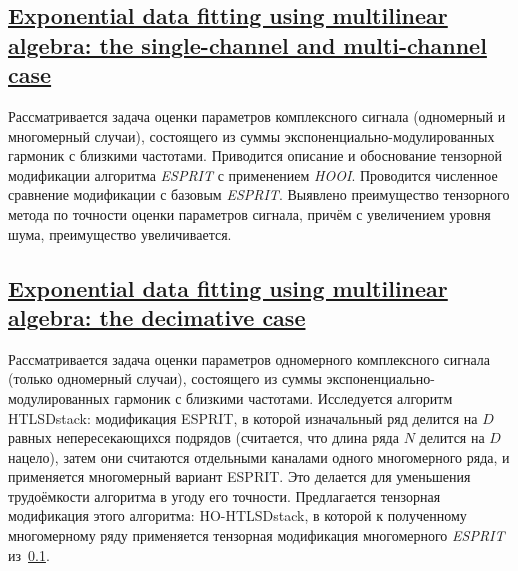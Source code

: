 \documentclass[12pt]{article}
\theoremstyle{plain}
\theoremstyle{definition}
\theoremstyle{remark}
\begin{document}
\subsection{\href{https://doi.org/10.1002/nla.453}{Exponential data
    fitting using multilinear algebra: the single-channel and
multi-channel case}}\label{Papy2005}
Рассматривается задача оценки параметров
комплексного сигнала (одномерный и многомерный случаи), состоящего из
суммы экспоненциально-модулированных гармоник с близкими частотами.
Приводится описание и обоснование тензорной модификации алгоритма
\emph{ESPRIT} с применением \emph{HOOI}.
Проводится численное сравнение модификации с базовым \emph{ESPRIT}.
Выявлено преимущество тензорного метода по точности оценки параметров
сигнала, причём с увеличением уровня шума, преимущество увеличивается.

\subsection{\href{https://doi.org/10.1002/cem.1212}{Exponential data
fitting using multilinear algebra: the decimative case}}
Рассматривается задача оценки параметров
одномерного комплексного сигнала (только одномерный случаи),
состоящего из суммы экспоненциально-модулированных гармоник с
близкими частотами.
Исследуется алгоритм HTLSDstack: модификация ESPRIT, в которой
изначальный ряд делится на $D$ равных непересекающихся подрядов (считается,
что длина ряда $N$ делится на $D$ нацело), затем они считаются
отдельными каналами одного многомерного ряда, и применяется
многомерный вариант ESPRIT.
Это делается для уменьшения трудоёмкости алгоритма в угоду его точности.
Предлагается тензорная модификация этого алгоритма: HO-HTLSDstack, в которой
к полученному многомерному ряду применяется тензорная модификация
многомерного \emph{ESPRIT} из~\ref{Papy2005}.
\end{document}
